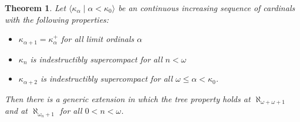 \documentclass[psamsfonts]{amsart}
\newtheorem{theorem}[thm]{Theorem}
\theoremstyle{definition}
\newcommand{\ka}{\kappa}
\newcommand{\w}{\omega}
\numberwithin{equation}{section}
\begin{document}
\begin{theorem}
	Let $\langle \ka_\alpha \mid \alpha < \ka_0\rangle$ be an continuous increasing sequence of cardinals with the following properties:
	\begin{itemize}
			\item $\ka_{\alpha+1} = \ka_\alpha^+$ for all limit ordinals $\alpha$
			\item $\ka_n$ is indestructibly supercompact for all $n<\w$
			\item $\ka_{\alpha+2}$ is indestructibly supercompact for all $\w\leq \alpha < \ka_0$.
		\end{itemize}

	Then there is a generic extension in which the tree property holds at $\aleph_{\w+\w+1}$ and at $\aleph_{\w_n+1}$ for all $0<n<\w$.
\end{theorem}
\end{document}

